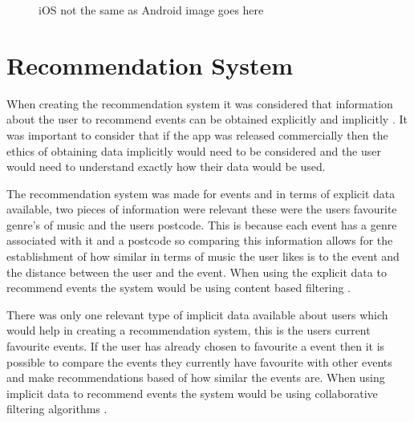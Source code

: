 \begin{figure} [H]
\caption{iOS not the same as Android image goes here}
\end{figure}


\section{Recommendation System}
When creating the recommendation system it was considered that information about the user to recommend events can be obtained explicitly and implicitly \cite{ML}. It was important to consider that if the app was released commercially then the ethics of obtaining data implicitly would need to be considered and the user would need to understand exactly how their data would be used.

The recommendation system was made for events and in terms of explicit data available, two pieces of information were relevant these were the users favourite genre's of music and the users postcode. This is because each event has a genre associated with it and a postcode so comparing this information allows for the establishment of how similar in terms of music the user likes is to the event and the distance between the user and the event. When using the explicit data to recommend events the system would be using content based filtering \cite{san}.

There was only one relevant type of implicit data available about users which would help in creating a recommendation system, this is the users current favourite events. If the user has already chosen to favourite a event then it is possible to compare the events they currently have favourite with other events and make recommendations based of how similar the events are. When using implicit data to recommend events the system would be using collaborative filtering algorithms \cite{collab}.

